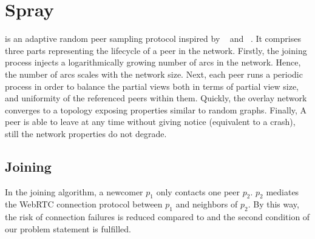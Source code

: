 
\section{Spray}
\label{sec:proposal}

\SPRAY is an adaptive random peer sampling protocol inspired by
\SCAMP~\cite{ganesh2003peer} and
\CYCLON~\cite{voulgaris2005cyclon}. It comprises three parts
representing the lifecycle of a peer in the network.  Firstly, the
joining process injects a logarithmically growing number of arcs in
the network. Hence, the number of arcs scales with the network size.
Next, each peer runs a periodic process in order to balance the
partial views both in terms of partial view size, and uniformity of
the referenced peers within them. Quickly, the overlay network
converges to a topology exposing properties similar to random
graphs. Finally, A peer is able to leave at any time without giving
notice (equivalent to a crash), still the network properties do not
degrade.

\subsection{Joining}



In the \SPRAY joining algorithm, a newcomer $p_1$ only contacts one
peer $p_2$. $p_2$ mediates the WebRTC connection protocol between $p_1$
and neighbors of $p_2$. By this way, the risk of connection failures is
reduced compared to \SCAMP and the second condition of our problem
statement is fulfilled.

